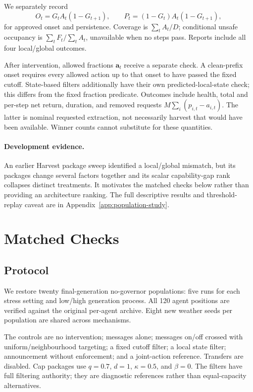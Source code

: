 \documentclass[10pt]{article}
\begin{document}
We separately record
\[
O_t=G_tA_t(1-G_{t+1}),\qquad
P_t=(1-G_t)A_t(1-G_{t+1}),
\]
for approved onset and persistence. Coverage is $\sum_tA_t/D$; conditional unsafe occupancy is $\sum_tF_t/\sum_tA_t$, unavailable when no steps pass. Reports include all four local/global outcomes.

After intervention, allowed fractions $\mathbf a_t$ receive a separate check. A clean-prefix onset requires every allowed action up to that onset to have passed the fixed cutoff. State-based filters additionally have their own predicted-local-state check; this differs from the fixed fraction predicate. Outcomes include health, total and per-step net return, duration, and removed requests $M\sum_i(p_{i,t}-a_{i,t})$. The latter is nominal requested extraction, not necessarily harvest that would have been available. Winner counts cannot substitute for these quantities.

\paragraph{Development evidence.}
An earlier Harvest package sweep identified a local/global mismatch, but its
packages change several factors together and its scalar capability-gap rank
collapses distinct treatments. It motivates the matched checks below rather
than providing an architecture ranking. The full descriptive results and
threshold-replay caveat are in Appendix~\ref{app:population-study}.

\section{Matched Checks}
\subsection{Protocol}
We restore twenty final-generation no-governor populations: five runs for each stress setting and low/high generation process. All 120 agent positions are verified against the original per-agent archive. Eight new weather seeds per population are shared across mechanisms.

The controls are no intervention; messages alone; messages on/off crossed with uniform/neighbourhood targeting; a fixed cutoff filter; a local state filter; announcement without enforcement; and a joint-action reference. Transfers are disabled. Cap packages use $q=0.7$, $d=1$, $\kappa=0.5$, and $\beta=0$. The filters have full filtering authority; they are diagnostic references rather than equal-capacity alternatives.
\end{document}
